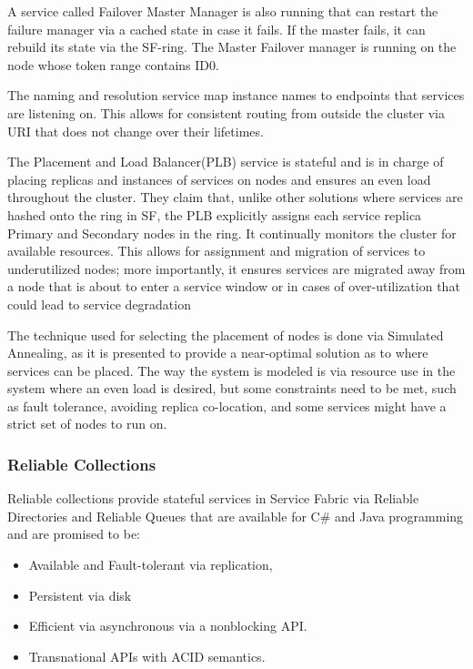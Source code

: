 \documentclass[a4paper,10pt,titlepage]{report}
\begin{document}
    A service called Failover Master Manager is also running that can restart the failure manager via a cached state in case it fails. If the master fails, it can rebuild its state via the SF-ring. The Master Failover manager is running on the node whose token range contains ID0.\\
    \vspace{5mm}

    The naming and resolution service map instance names to endpoints that services are listening on. This allows for consistent routing from outside the cluster via URI that does not change over their lifetimes.\\
    \vspace{5mm}

    The Placement and Load Balancer(PLB) service is stateful and is in charge of placing replicas and instances of services on nodes and ensures an even load throughout the cluster. They claim that, unlike other solutions where services are hashed onto the ring in SF, the PLB explicitly assigns each service replica Primary and Secondary nodes in the ring. It continually monitors the cluster for available resources. This allows for assignment and migration of services to underutilized nodes; more importantly, it ensures services are migrated away from a node that is about to enter a service window or in cases of over-utilization that could lead to service degradation\\
    \vspace{5mm}

    The technique used for selecting the placement of nodes is done via Simulated Annealing, as it is presented to provide a near-optimal solution as to where services can be placed. The way the system is modeled is via resource use in the system where an even load is desired, but some constraints need to be met, such as fault tolerance, avoiding replica co-location, and some services might have a strict set of nodes to run on. \\
    \vspace{5mm}

    \subsubsection{Reliable Collections}

    Reliable collections provide stateful services in Service Fabric via Reliable Directories and Reliable Queues that are available for C\# and Java programming and are promised to be:
    \begin{itemize}
        \item Available and Fault-tolerant via replication,
        \item Persistent via disk
        \item Efficient via asynchronous via a nonblocking API.
        \item Transnational APIs with ACID semantics.
    \end{itemize}
\end{document}

